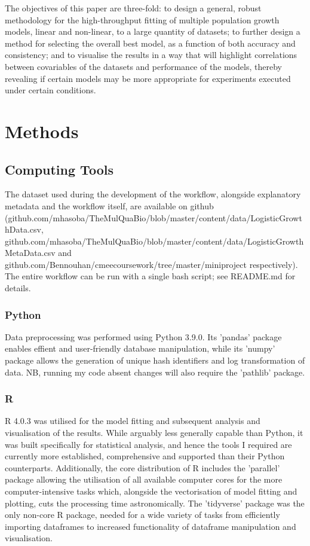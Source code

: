 \documentclass[11pt]{article}
\begin{document}
The objectives of this paper are three-fold: to design a general, robust methodology for the high-throughput fitting of multiple population growth models, linear and non-linear, to a large quantity of datasets; to further design a method for selecting the overall best model, as a function of both accuracy and consistency; and to visualise the results in a way that will highlight correlations between covariables of the datasets and performance of the models, thereby revealing if certain models may be more appropriate for experiments executed under certain conditions.



\vspace{5mm}
\section{Methods}%

\subsection{Computing Tools}
The dataset used during the development of the workflow, alongside explanatory metadata and the workflow itself, are available on github (github.com/mhasoba/TheMulQuaBio/blob/master/content/data/LogisticGrowthData.csv, github.com/mhasoba/TheMulQuaBio/blob/master/content/data/LogisticGrowthMetaData.csv and github.com/Bennouhan/cmeecoursework/tree/master/miniproject respectively). The entire workflow can be run with a single bash script; see README.md for details.

\subsubsection{Python}
Data preprocessing was performed using Python 3.9.0. Its 'pandas' package enables effient and user-friendly database manipulation, while its 'numpy' package allows the generation of unique hash identifiers and log transformation of data. NB, running my code absent changes will also require the 'pathlib' package.

\subsubsection{R}
R 4.0.3 was utilised for the model fitting and subsequent analysis and visualisation of the results. While arguably less generally capable than Python, it was built specifically for statistical analysis, and hence the tools I required are currently more established, comprehensive and supported than their Python counterparts. Additionally, the core distribution of R includes the 'parallel' package allowing the utilisation of all available computer cores for the more computer-intensive tasks which, alongside the vectorisation of model fitting and plotting, cuts the processing time astronomically. The 'tidyverse' package was the only non-core R package, needed for a wide variety of tasks from efficiently importing dataframes to increased functionality of dataframe manipulation and visualisation. 
\end{document}
